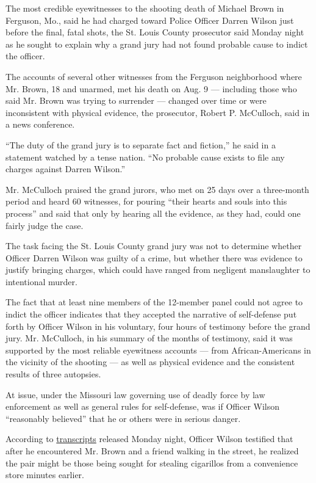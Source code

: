 The most credible eyewitnesses to the shooting death of Michael Brown in
Ferguson, Mo., said he had charged toward Police Officer Darren Wilson
just before the final, fatal shots, the St. Louis County prosecutor said
Monday night as he sought to explain why a grand jury had not found
probable cause to indict the officer.

The accounts of several other witnesses from the Ferguson neighborhood
where Mr. Brown, 18 and unarmed, met his death on Aug. 9 --- including
those who said Mr. Brown was trying to surrender --- changed over time
or were inconsistent with physical evidence, the prosecutor, Robert P.
McCulloch, said in a news conference.

``The duty of the grand jury is to separate fact and fiction,'' he said
in a statement watched by a tense nation. ``No probable cause exists to
file any charges against Darren Wilson.''

Mr. McCulloch praised the grand jurors, who met on 25 days over a
three-month period and heard 60 witnesses, for pouring ``their hearts
and souls into this process'' and said that only by hearing all the
evidence, as they had, could one fairly judge the case.

The task facing the St. Louis County grand jury was not to determine
whether Officer Darren Wilson was guilty of a crime, but whether there
was evidence to justify bringing charges, which could have ranged from
negligent manslaughter to intentional murder.

The fact that at least nine members of the 12-member panel could not
agree to indict the officer indicates that they accepted the narrative
of self-defense put forth by Officer Wilson in his voluntary, four hours
of testimony before the grand jury. Mr. McCulloch, in his summary of the
months of testimony, said it was supported by the most reliable
eyewitness accounts --- from African-Americans in the vicinity of the
shooting --- as well as physical evidence and the consistent results of
three autopsies.

At issue, under the Missouri law governing use of deadly force by law
enforcement as well as general rules for self-defense, was if Officer
Wilson ``reasonably believed'' that he or others were in serious danger.

According to
\href{http://graphics8.nytimes.com/newsgraphics/2014/11/24/ferguson-assets/grand-jury-testimony.pdf}{transcripts}
released Monday night, Officer Wilson testified that after he
encountered Mr. Brown and a friend walking in the street, he realized
the pair might be those being sought for stealing cigarillos from a
convenience store minutes earlier.


